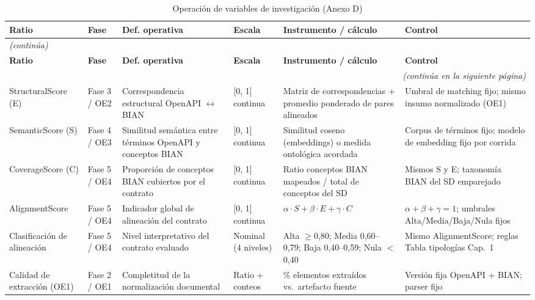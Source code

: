 \begin{longtable}{@{}p{}p{}p{}p{}p{}p{}@{}}
\caption{Operación de variables de investigación (Anexo D)} \label{tab:anexo-d} \\
\toprule
\textbf{Ratio} & \textbf{Fase} & \textbf{Def. operativa} & \textbf{Escala} & \textbf{Instrumento / cálculo} & \textbf{Control} \\
\midrule
\endfirsthead
\multicolumn{6}{l}{\textit{(continúa)}} \\
\midrule
\textbf{Ratio} & \textbf{Fase} & \textbf{Def. operativa} & \textbf{Escala} & \textbf{Instrumento / cálculo} & \textbf{Control} \\
\midrule
\endhead
\midrule
\multicolumn{6}{r}{\textit{(continúa en la siguiente página)}} \\
\endfoot
\bottomrule
\endlastfoot
StructuralScore (E) & Fase 3 / OE2 & Correspondencia estructural OpenAPI $\leftrightarrow$ BIAN & [0, 1] continua & Matriz de correspondencias + promedio ponderado de pares alineados & Umbral de matching fijo; mismo insumo normalizado (OE1) \\
SemanticScore (S) & Fase 4 / OE3 & Similitud semántica entre términos OpenAPI y conceptos BIAN & [0, 1] continua & Similitud coseno (embeddings) o medida ontológica acordada & Corpus de términos fijo; modelo de embedding fijo por corrida \\
CoverageScore (C) & Fase 5 / OE4 & Proporción de conceptos BIAN cubiertos por el contrato & [0, 1] continua & Ratio conceptos BIAN mapeados / total de conceptos del SD & Mismos S y E; taxonomía BIAN del SD emparejado \\
AlignmentScore & Fase 5 / OE4 & Indicador global de alineación del contrato & [0, 1] continua & $\alpha \cdot S + \beta \cdot E + \gamma \cdot C$ & $\alpha+\beta+\gamma=1$; umbrales Alta/Media/Baja/Nula fijos \\
Clasificación de alineación & Fase 5 / OE4 & Nivel interpretativo del contrato evaluado & Nominal (4 niveles) & Alta $\geq$0,80; Media 0,60--0,79; Baja 0,40--0,59; Nula $<$0,40 & Mismo AlignmentScore; reglas Tabla tipologías Cap.~1 \\
Calidad de extracción (OE1) & Fase 2 / OE1 & Completitud de la normalización documental & Ratio + conteos & \% elementos extraídos vs.\ artefacto fuente & Versión fija OpenAPI + BIAN; parser fijo \\
\end{longtable}
